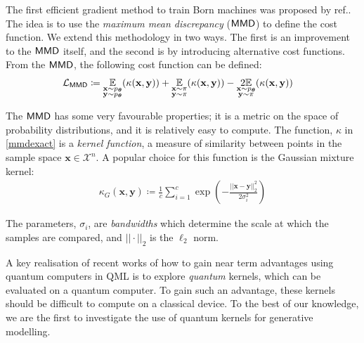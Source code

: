 The first efficient gradient method to train Born machines was proposed by ref.\cite{liu_differentiable_2018}. 
The idea is to use the \textit{maximum mean discrepancy} ($\operatorname{\textsf{MMD}}$) to define the cost function. We extend this methodology in two ways. The first is an improvement to the $\operatorname{\textsf{MMD}}$ itself, and the second is by introducing alternative cost functions. From the $\operatorname{\textsf{MMD}}$, the following cost function\cite{borgwardt_integrating_2006, gretton_kernel_2007} can be defined:
\begin{align}
   \mathcal{L}_{\operatorname{\textsf{MMD}}} & \coloneqq \underset{\substack{\mathbf{x} \sim p_{\boldsymbol\theta}\\ \mathbf{y} \sim p_{\boldsymbol\theta}}}{\mathbb{E}}(\kappa(\mathbf{x},\mathbf{y})) + \underset{\substack{\mathbf{x} \sim \pi \\\mathbf{y} \sim \pi }}{\mathbb{E}}(\kappa(\mathbf{x},\mathbf{y})) -\underset{\substack{\mathbf{x} \sim p_{\boldsymbol\theta}\\ \mathbf{y} \sim \pi}}{2\mathbb{E}}(\kappa(\mathbf{x},\mathbf{y})) \label{mmdexact}
\end{align}

\noindent The $\operatorname{\textsf{MMD}}$ has some very favourable properties; it is a metric on the space of probability distributions, and it is relatively easy to compute. The function, $\kappa$ in \eqref{mmdexact} is a \textit{kernel function}, a measure of similarity between points in the sample space $ \mathbf{x}\in\mathcal{X}^n$. A popular choice for this function is the Gaussian mixture kernel\cite{liu_differentiable_2018}:
\begin{align}
    \kappa_G(\mathbf{x}, \mathbf{y}) \coloneqq  \frac{1}{c}\sum_{i=1}^c\exp\left(-\frac{||\mathbf{x}-\mathbf{y}||^2_2}{2\sigma_i^2}\right) \label{gaussiankernel}
\end{align}

The parameters, $\sigma_i$, are \emph{bandwidths} which determine the scale at which the samples are compared, and $||\cdot||_2$ is the $\ell_2$ norm.

A key realisation of recent works\cite{havlicek_supervised_2019, schuld_supervised_2018} of how to gain near term advantages using quantum computers in QML is to explore \textit{quantum} kernels, which can be evaluated on a quantum computer. To gain such an advantage, these kernels should be difficult to compute on a classical device. To the best of our knowledge, we are the first to investigate the use of quantum kernels for generative modelling.

